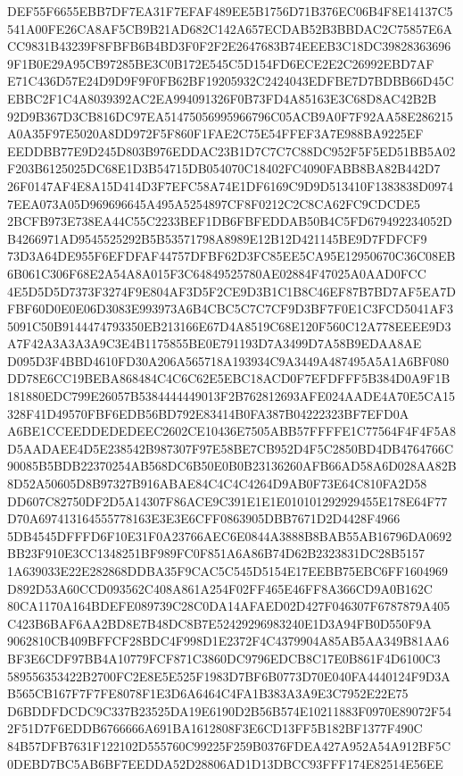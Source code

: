 \documentclass[UTF8,fontset=fandol,zihao=-4,a4paper]{ctexart}
\begin{document}
{{DEF55F6655EBB7DF7EA31F7EFAF489EE5B1756D71B376EC06B4F8E14137C5541A00FE26CA8AF5CB9B21AD682C142A657ECDAB52B3BBDAC2C75857E6A
CC9831B43239F8FBFB6B4BD3F0F2F2E2647683B74EEEB3C18DC398283636969F1B0E29A95CB97285BE3C0B172E545C5D154FD6ECE2E2C26992EBD7AF
E71C436D57E24D9D9F9F0FB62BF19205932C2424043EDFBE7D7BDBB66D45CEBBC2F1C4A8039392AC2EA994091326F0B73FD4A85163E3C68D8AC42B2B
92D9B367D3CB816DC97EA51475056995966796C05ACB9A0F7F92AA58E286215A0A35F97E5020A8DD972F5F860F1FAE2C75E54FFEF3A7E988BA9225EF
EEDDBB77E9D245D803B976EDDAC23B1D7C7C7C88DC952F5F5ED51BB5A02F203B6125025DC68E1D3B54715DB054070C18402FC4090FABB8BA82B442D7
26F0147AF4E8A15D414D3F7EFC58A74E1DF6169C9D9D513410F1383838D09747EEA073A05D969696645A495A5254897CF8F0212C2C8CA62FC9CDCDE5
2BCFB973E738EA44C55C2233BEF1DB6FBFEDDAB50B4C5FD679492234052DB4266971AD9545525292B5B53571798A8989E12B12D421145BE9D7FDFCF9
73D3A64DE955F6EFDFAF44757DFBF62D3FC85EE5CA95E12950670C36C08EB6B061C306F68E2A54A8A015F3C64849525780AE02884F47025A0AAD0FCC
4E5D5D5D7373F3274F9E804AF3D5F2CE9D3B1C1B8C46EF87B7BD7AF5EA7DFBF60D0E0E06D3083E993973A6B4CBC5C7C7CF9D3BF7F0E1C3FCD5041AF3
5091C50B9144474793350EB213166E67D4A8519C68E120F560C12A778EEEE9D3A7F42A3A3A3A9C3E4B1175855BE0E791193D7A3499D7A58B9EDAA8AE
D095D3F4BBD4610FD30A206A565718A193934C9A3449A487495A5A1A6BF080DD78E6CC19BEBA868484C4C6C62E5EBC18ACD0F7EFDFFF5B384D0A9F1B
181880EDC799E26057B5384444449013F2B762812693AFE024AADE4A70E5CA15328F41D49570FBF6EDB56BD792E83414B0FA387B04222323BF7EFD0A
A6BE1CCEEDDEDEDEEC2602CE10436E7505ABB57FFFFE1C77564F4F4F5A8D5AADAEE4D5E238542B987307F97E58BE7CB952D4F5C2850BD4DB4764766C
90085B5BDB22370254AB568DC6B50E0B0B23136260AFB66AD58A6D028AA82B8D52A50605D8B97327B916ABAE84C4C4C4264D9AB0F73E64C810FA2D58
DD607C82750DF2D5A14307F86ACE9C391E1E1E010101292929455E178E64F77D70A697413164555778163E3E3E6CFF0863905DBB7671D2D4428F4966
5DB4545DFFFD6F10E31F0A23766AEC6E0844A3888B8BAB55AB16796DA0692BB23F910E3CC1348251BF989FC0F851A6A86B74D62B2323831DC28B5157
1A639033E22E282868DDBA35F9CAC5C545D5154E17EEBB75EBC6FF1604969D892D53A60CCD093562C408A861A254F02FF465E46FF8A366CD9A0B162C
80CA1170A164BDEFE089739C28C0DA14AFAED02D427F046307F6787879A405C423B6BAF6AA2BD8E7B48DC8B7E52429296983240E1D3A94FB0D550F9A
9062810CB409BFFCF28BDC4F998D1E2372F4C4379904A85AB5AA349B81AA6BF3E6CDF97BB4A10779FCF871C3860DC9796EDCB8C17E0B861F4D6100C3
589556353422B2700FC2E8E5E525F1983D7BF6B0773D70E040FA4440124F9D3AB565CB167F7F7FE8078F1E3D6A6464C4FA1B383A3A9E3C7952E22E75
D6BDDFDCDC9C337B23525DA19E6190D2B56B574E10211883F0970E89072F542F51D7F6EDDB6766666A691BA1612808F3E6CD13FF5B182BF1377F490C
84B57DFB7631F122102D555760C99225F259B0376FDEA427A952A54A912BF5C0DEBD7BC5AB6BF7EEDDA52D28806AD1D13DBCC93FFF174E82514E56EE
}}
\end{document}
